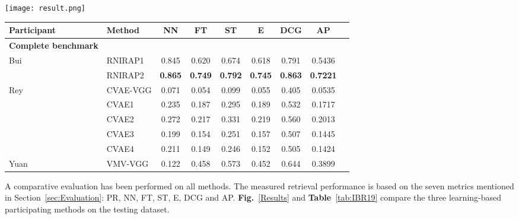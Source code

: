 \documentclass[../main.tex]{subfiles}
\begin{document}
\begin{center}
\texttt{[image: result.png]}

\label{Results}	
\end{center}


\begin{table*}[!htb]
	\centering
	\caption{Performance metrics comparison on the SHREC'19 SceneIBR Track Benchmark.}
	\label{tab:IBR19}
	\begin{tabular}{llccccccc}
		\hline		
		\normalsize {\textbf{Participant}}	&\normalsize {\textbf{Method}} &\normalsize {\textbf{NN}}  &\normalsize {\textbf{FT}} &\normalsize {\textbf{ST}} &\normalsize {\textbf{E}} &\normalsize {\textbf{DCG}} &\normalsize {\textbf{AP}}\\
		\hline
		\textbf{\normalsize{Complete benchmark}}\\
		\hline
		\multirow{2}{*}{Bui} &RNIRAP1 &0.845    &0.620   &0.674   &0.618   
		&0.791  &  0.5436\\	
		\cline{2-8}
		&RNIRAP2 &\textbf{0.865}    &\textbf{0.749}   &\textbf{0.792}   &\textbf{0.745}   &\textbf{0.863} &\textbf{0.7221}\\	
		\hline  		 									
		\multirow{5}{*}{Rey} &CVAE-VGG &0.071    &0.054   &0.099   &0.055   &0.405 &0.0535\\ \cline{2-8}&CVAE1  &0.235    &0.187   &0.295   &0.189   &0.532 &0.1717\\
		\cline{2-8}
		&CVAE2 &0.272    &0.217   &0.331   &0.219   &0.560  &0.2013\\
		\cline{2-8}
		&CVAE3 &0.199    &0.154   &0.251   &0.157   &0.507 &0.1445\\
		\cline{2-8}
		&CVAE4 &0.211    &0.149   &0.246   &0.152   &0.505  &0.1424\\
		\hline							
		Yuan &VMV-VGG &0.122	 &0.458	 &0.573	 &0.452	 &0.644 &0.3899\\			
		\hline		
	\end{tabular}
\end{table*}

A comparative evaluation has been performed on all methods. The measured 
retrieval performance is based on the seven metrics mentioned in 
Section~\ref{sec:Evaluation}: PR, NN, FT, ST, E, DCG and AP. 
\textbf{Fig.}~\ref{Results} and \textbf{Table}~\ref{tab:IBR19} compare the 
three learning-based participating methods on the testing dataset.
\end{document}
